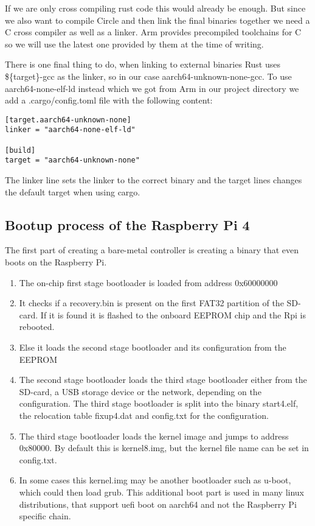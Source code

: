 If we are only cross compiling rust code this would already be enough.
But since we also want to compile Circle and then link the final binaries together we need a C cross compiler as well as a linker.
Arm provides precompiled toolchains for C so we will use the latest one provided by them at the time of writing.

There is one final thing to do, when linking to external binaries Rust uses \$\{target\}-gcc as the linker, so in our case aarch64-unknown-none-gcc.
To use aarch64-none-elf-ld instead which we got from Arm in our project directory we add a .cargo/config.toml file with the following content:
\begin{verbatim}
[target.aarch64-unknown-none]
linker = "aarch64-none-elf-ld"

[build]
target = "aarch64-unknown-none"
\end{verbatim}
The linker line sets the linker to the correct binary and the target lines changes the default target when using cargo.

\subsection{Bootup process of the Raspberry Pi 4}
\label{sec:concept_and_implementation:bare-metal:boot}

The first part of creating a bare-metal controller is creating a binary that even boots on the Raspberry Pi.
\begin{enumerate}
    \item The on-chip first stage bootloader is loaded from address 0x60000000
    \item It checks if a recovery.bin is present on the first FAT32 partition of the SD-card. If it is found it is flashed to the onboard EEPROM chip and the Rpi is rebooted.
    \item Else it loads the second stage bootloader and its configuration from the EEPROM
    \item The second stage bootloader loads the third stage bootloader either from the SD-card, a USB storage device or the network, depending on the configuration.
        The third stage bootloader is split into the binary start4.elf, the relocation table fixup4.dat and config.txt for the configuration.
    \item The third stage bootloader loads the kernel image and jumps to address 0x80000. By default this is kernel8.img, but the kernel file name can be set in config.txt.
    \item In some cases this kernel.img may be another bootloader such as u-boot, which could then load grub.
        This additional boot part is used in many linux distributions, that support uefi boot on aarch64 and not the Raspberry Pi specific chain.
\end{enumerate}

